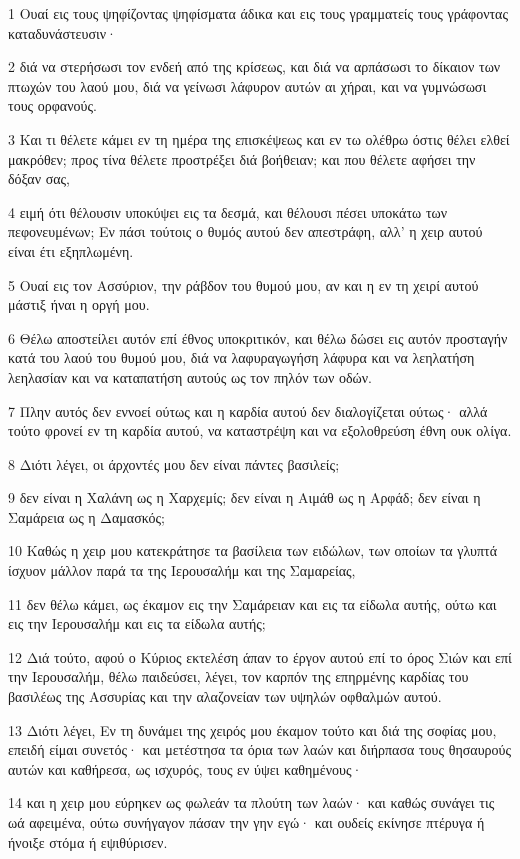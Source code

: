 \par 1 Ουαί εις τους ψηφίζοντας ψηφίσματα άδικα και εις τους γραμματείς τους γράφοντας καταδυνάστευσιν·
\par 2 διά να στερήσωσι τον ενδεή από της κρίσεως, και διά να αρπάσωσι το δίκαιον των πτωχών του λαού μου, διά να γείνωσι λάφυρον αυτών αι χήραι, και να γυμνώσωσι τους ορφανούς.
\par 3 Και τι θέλετε κάμει εν τη ημέρα της επισκέψεως και εν τω ολέθρω όστις θέλει ελθεί μακρόθεν; προς τίνα θέλετε προστρέξει διά βοήθειαν; και που θέλετε αφήσει την δόξαν σας,
\par 4 ειμή ότι θέλουσιν υποκύψει εις τα δεσμά, και θέλουσι πέσει υποκάτω των πεφονευμένων; Εν πάσι τούτοις ο θυμός αυτού δεν απεστράφη, αλλ' η χειρ αυτού είναι έτι εξηπλωμένη.
\par 5 Ουαί εις τον Ασσύριον, την ράβδον του θυμού μου, αν και η εν τη χειρί αυτού μάστιξ ήναι η οργή μου.
\par 6 Θέλω αποστείλει αυτόν επί έθνος υποκριτικόν, και θέλω δώσει εις αυτόν προσταγήν κατά του λαού του θυμού μου, διά να λαφυραγωγήση λάφυρα και να λεηλατήση λεηλασίαν και να καταπατήση αυτούς ως τον πηλόν των οδών.
\par 7 Πλην αυτός δεν εννοεί ούτως και η καρδία αυτού δεν διαλογίζεται ούτως· αλλά τούτο φρονεί εν τη καρδία αυτού, να καταστρέψη και να εξολοθρεύση έθνη ουκ ολίγα.
\par 8 Διότι λέγει, οι άρχοντές μου δεν είναι πάντες βασιλείς;
\par 9 δεν είναι η Χαλάνη ως η Χαρχεμίς; δεν είναι η Αιμάθ ως η Αρφάδ; δεν είναι η Σαμάρεια ως η Δαμασκός;
\par 10 Καθώς η χειρ μου κατεκράτησε τα βασίλεια των ειδώλων, των οποίων τα γλυπτά ίσχυον μάλλον παρά τα της Ιερουσαλήμ και της Σαμαρείας,
\par 11 δεν θέλω κάμει, ως έκαμον εις την Σαμάρειαν και εις τα είδωλα αυτής, ούτω και εις την Ιερουσαλήμ και εις τα είδωλα αυτής;
\par 12 Διά τούτο, αφού ο Κύριος εκτελέση άπαν το έργον αυτού επί το όρος Σιών και επί την Ιερουσαλήμ, θέλω παιδεύσει, λέγει, τον καρπόν της επηρμένης καρδίας του βασιλέως της Ασσυρίας και την αλαζονείαν των υψηλών οφθαλμών αυτού.
\par 13 Διότι λέγει, Εν τη δυνάμει της χειρός μου έκαμον τούτο και διά της σοφίας μου, επειδή είμαι συνετός· και μετέστησα τα όρια των λαών και διήρπασα τους θησαυρούς αυτών και καθήρεσα, ως ισχυρός, τους εν ύψει καθημένους·
\par 14 και η χειρ μου εύρηκεν ως φωλεάν τα πλούτη των λαών· και καθώς συνάγει τις ωά αφειμένα, ούτω συνήγαγον πάσαν την γην εγώ· και ουδείς εκίνησε πτέρυγα ή ήνοιξε στόμα ή εψιθύρισεν.
